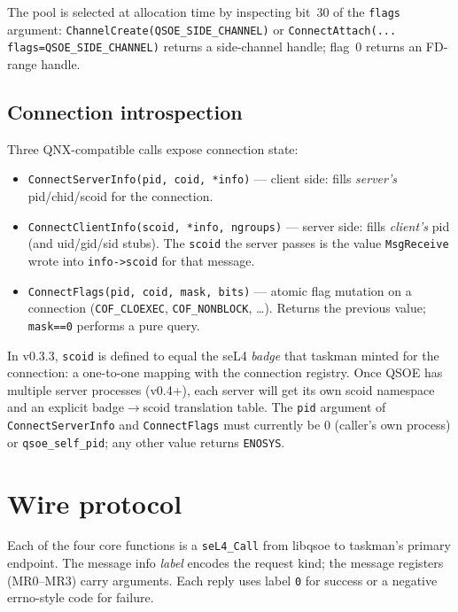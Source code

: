 The pool is selected at allocation time by inspecting bit~30 of the
\texttt{flags} argument: \texttt{ChannelCreate(QSOE\_SIDE\_CHANNEL)} or
\texttt{ConnectAttach(... flags=QSOE\_SIDE\_CHANNEL)} returns a
side-channel handle; flag~0 returns an FD-range handle.

\subsection{Connection introspection}
\label{sec:connect-info}

Three QNX-compatible calls expose connection state:

\begin{itemize}
    \item \texttt{ConnectServerInfo(pid, coid, *info)} --- client side:
          fills \emph{server's} pid/chid/scoid for the connection.
    \item \texttt{ConnectClientInfo(scoid, *info, ngroups)} --- server
          side: fills \emph{client's} pid (and uid/gid/sid stubs).
          The \texttt{scoid} the server passes is the value
          \texttt{MsgReceive} wrote into \texttt{info->scoid} for that
          message.
    \item \texttt{ConnectFlags(pid, coid, mask, bits)} --- atomic flag
          mutation on a connection (\texttt{COF\_CLOEXEC},
          \texttt{COF\_NONBLOCK}, \ldots).  Returns the previous value;
          \texttt{mask==0} performs a pure query.
\end{itemize}

In v0.3.3, \texttt{scoid} is defined to equal the seL4 \emph{badge}
that taskman minted for the connection: a one-to-one mapping with the
connection registry.  Once QSOE has multiple server processes (v0.4+),
each server will get its own scoid namespace and an explicit
badge$\to$scoid translation table.  The \texttt{pid} argument of
\texttt{ConnectServerInfo} and \texttt{ConnectFlags} must currently be
0 (caller's own process) or \texttt{qsoe\_self\_pid}; any other value
returns \texttt{ENOSYS}.

\section{Wire protocol}
\label{sec:wire-protocol}

Each of the four core functions is a \texttt{seL4\_Call} from libqsoe
to taskman's primary endpoint.  The message info \emph{label} encodes
the request kind; the message registers (MR0--MR3) carry arguments.
Each reply uses label \texttt{0} for success or a negative
errno-style code for failure.

